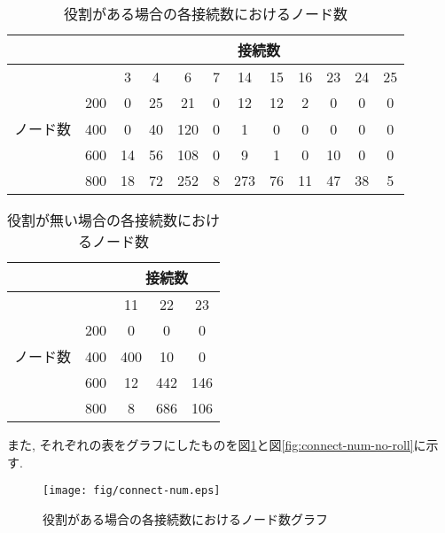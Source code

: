 \newpage

\begin{table}[h]
  \caption{役割がある場合の各接続数におけるノード数}
  \label{tbl:connect-num}
  \centering
      {\small
        \begin{tabular}{|c|c||c|c|c|c|c|c|c|c|c|c|} \hline
                &     & \multicolumn{10}{|c|}{接続数} \\ \hline
                &     & 3  & 4  & 6   & 7 & 14 & 15 & 16 & 23 & 24 & 25 \\ \hline \cline{2-12}
                & 200 & 0  & 25 & 21  & 0 & 12 & 12 & 2  & 0  & 0  & 0  \\ \cline{2-12}
        ノード数 & 400 & 0  & 40 & 120 & 0 & 1  & 0  & 0  & 0  & 0  & 0  \\ \cline{2-12}
                & 600 & 14 & 56 & 108 & 0 & 9  & 1  & 0  & 10 & 0  & 0  \\ \cline{2-12}
                & 800 & 18 & 72 & 252 & 8 & 273& 76 & 11 & 47 & 38 & 5  \\ \cline{2-12}
        \hline
        \end{tabular}
      }
\end{table}

\begin{table}[h]
  \caption{役割が無い場合の各接続数におけるノード数}
  \label{tbl:connect-num-no-roll}
  \centering
      {\small
        \begin{tabular}{|c|c||c|c|c|} \hline
                &     & \multicolumn{3}{|c|}{接続数} \\ \hline
                &     & 11  & 22 & 23   \\ \hline \cline{2-5}
                & 200 & 0   & 0  & 0    \\ \cline{2-5}
        ノード数 & 400 & 400 & 10 & 0 \\ \cline{2-5}
                & 600 & 12 & 442 & 146 \\ \cline{2-5}
                & 800 & 8 & 686 & 106 \\ \cline{2-5}
        \hline
        \end{tabular}
      }
\end{table}

\newpage

また, それぞれの表をグラフにしたものを図\ref{fig:connect-num}と図\ref{fig:connect-num-no-roll}に示す.

\begin{figure}[h]
  \centering
  \texttt{[image: fig/connect-num.eps]}
  \caption{役割がある場合の各接続数におけるノード数グラフ}
  \label{fig:connect-num}
\end{figure}

